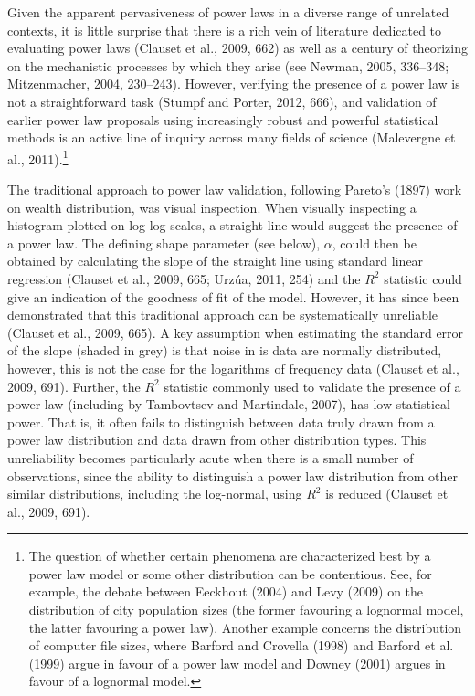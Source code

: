Given the apparent pervasiveness of power laws in a diverse range of unrelated contexts, it is little surprise that there is a rich vein of literature dedicated to evaluating power laws (Clauset et al., 2009, 662) as well as a century of theorizing on the mechanistic processes by which they arise (see Newman, 2005, 336--348; Mitzenmacher, 2004, 230--243). However, verifying the presence of a power law is not a straightforward task (Stumpf and Porter, 2012, 666), and validation of earlier power law proposals using increasingly robust and powerful statistical methods is an active line of inquiry across many fields of science (Malevergne et al., 2011).\footnote{The question of whether certain phenomena are characterized best by a power law model or some other distribution can be contentious. See, for example, the debate between Eeckhout (2004) and Levy (2009) on the distribution of city population sizes (the former favouring a lognormal model, the latter favouring a power law). Another example concerns the distribution of computer file sizes, where Barford and Crovella (1998) and Barford et al. (1999) argue in favour of a power law model and Downey (2001) argues in favour of a lognormal model.}

The traditional approach to power law validation, following Pareto's (1897) work on wealth distribution, was visual inspection. When visually inspecting a histogram plotted on log-log scales, a straight line would suggest the presence of a power law. The defining shape parameter (see below), \(\alpha\), could then be obtained by calculating the slope of the straight line using standard linear regression (Clauset et al., 2009, 665; Urzúa, 2011, 254) and the \(R^2\) statistic could give an indication of the goodness of fit of the model. However, it has since been demonstrated that this traditional approach can be systematically unreliable (Clauset et al., 2009, 665). A key assumption when estimating the standard error of the slope (shaded in grey) is that noise in is data are normally distributed, however, this is not the case for the logarithms of frequency data (Clauset et al., 2009, 691). Further, the \(R^2\) statistic commonly used to validate the presence of a power law (including by Tambovtsev and Martindale, 2007), has low statistical power. That is, it often fails to distinguish between data truly drawn from a power law distribution and data drawn from other distribution types. This unreliability becomes particularly acute when there is a small number of observations, since the ability to distinguish a power law distribution from other similar distributions, including the log-normal, using \(R^2\) is reduced (Clauset et al., 2009, 691).

